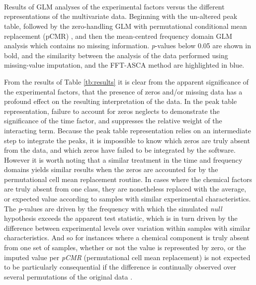 \documentclass[preprint,12pt]{elsarticle}
\begin{document}
\begin{table} %
 \\
 \\ 
 \\

\caption{Results of GLM analyses of the experimental factors versus the different representations of the multivariate data. Beginning with the un-altered peak table, followed by the zero-handling GLM with permutational conditional mean replacement (pCMR) \cite{pCMR}, and then the mean-centred frequency domain GLM analysis which contains no missing information. \textit{p}-values below 0.05 are shown in bold, and the similarity between the analysis of the data performed using missing-value imputation, and the FFT-ASCA method are highlighted in blue.}
\label{tb:results}

\end{table}

From the results of Table \ref{tb:results} it is clear from the apparent significance of the experimental factors, that the presence of zeros and/or missing data has a profound effect on the resulting interpretation of the data. In the peak table representation, failure to account for zeros neglects to demonstrate the significance of the time factor, and suppresses the relative weight of the interacting term. Because the peak table representation relies on an intermediate step to integrate the peaks, it is impossible to know which zeros are truly absent from the data, and which zeros have failed to be integrated by the software. However it is worth noting that a similar treatment in the time and frequency domains yields similar results when the zeros are accounted for by the permutational cell mean replacement routine. In cases where the chemical factors are truly absent from one class, they are nonetheless replaced with the average, or expected value according to samples with similar experimental characteristics. The \textit{p}-values are driven by the frequency with which the simulated \textit{null} hypothesis exceeds the apparent test statistic, which is in turn driven by the difference between experimental levels over variation within samples with similar characteristics. And so for instances where a chemical component is truly absent from one set of samples, whether or not the value is represented by zero, or the imputed value per \textit{pCMR} (permutational cell mean replacement) is not expected to be particularly consequential if the difference is continually observed over several permutations of the original data \cite{merchanskaya2024considerations}.
\end{document}

